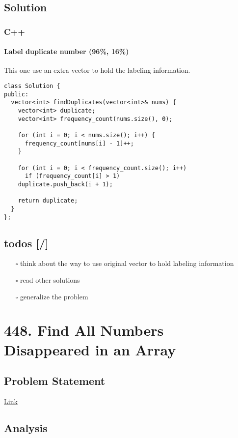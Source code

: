 \documentclass[12pt]{book}
\begin{document}
\section{Solution}
\label{sec:orgf2e31dd}
\subsection{C++}
\label{sec:org4575a6b}
\subsubsection{Label duplicate number (96\%, 16\%)}
\label{sec:org682dba4}
This one use an extra vector to hold the labeling information.
\begin{verbatim}
class Solution {
public:
  vector<int> findDuplicates(vector<int>& nums) {
    vector<int> duplicate;
    vector<int> frequency_count(nums.size(), 0);

    for (int i = 0; i < nums.size(); i++) {
      frequency_count[nums[i] - 1]++;
    }

    for (int i = 0; i < frequency_count.size(); i++)
      if (frequency_count[i] > 1)
	duplicate.push_back(i + 1);

    return duplicate;
  }
};
\end{verbatim}

\section{todos [/]}
\label{sec:orge907b64}
\begin{itemize}
\item[{$\square$}] think about the way to use original vector to hold labeling information
\item[{$\square$}] read other solutions
\item[{$\square$}] generalize the problem
\end{itemize}
\chapter{448. Find All Numbers Disappeared in an Array}
\label{sec:orgbacefbe}
\section{Problem Statement}
\label{sec:orgde4502f}
\href{https://leetcode.com/problems/find-all-numbers-disappeared-in-an-array/}{Link}
\section{Analysis}
\label{sec:org1df177b}
\end{document}
